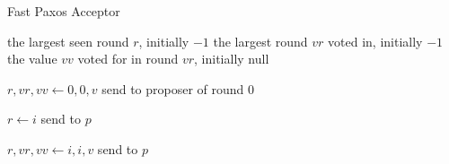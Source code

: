 \newcommand{\nullbot}{\textsf{null}}

\begin{algorithm}[ht]
  \caption{Fast Paxos Acceptor}%
  \begin{algorithmic}[1]
    \GlobalState the largest seen round $r$, initially $-1$ 
    \GlobalState the largest round $vr$ voted in, initially $-1$
    \GlobalState the value $vv$ voted for in round $vr$, initially \nullbot{}

     
        \State $r, vr, vv \gets 0, 0, v$
        \State send  to proposer of round $0$
      \EndIf
    \EndUpon{} 

      \State $r \gets i$
      \State send  to $p$
    \EndUpon {}

      \State $r, vr, vv \gets i, i, v$
      \State send  to $p$
    \EndUpon
  \end{algorithmic}
\end{algorithm}
